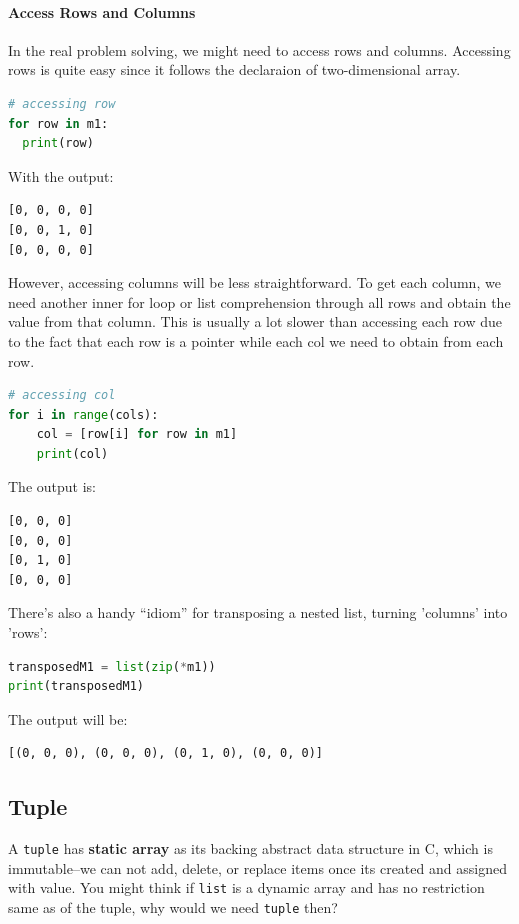 \documentclass[../main.tex]{subfiles}
\begin{document}
\paragraph{Access Rows and Columns} In the real problem solving, we might need to access rows and columns.  Accessing rows is quite easy since it follows the declaraion of two-dimensional array.  
\begin{lstlisting}[language=Python]
# accessing row
for row in m1:
  print(row)
\end{lstlisting}
With the output:
\begin{lstlisting}[numbers=none]
[0, 0, 0, 0]
[0, 0, 1, 0]
[0, 0, 0, 0]
\end{lstlisting}
However, accessing columns will be less straightforward. To get each column, we need another inner for loop or list comprehension through all rows and obtain the value from that column. This is usually a lot slower than accessing each row due to the fact that each row is a pointer while each col we need to obtain from each row. 
\begin{lstlisting}[language=Python]
# accessing col
for i in range(cols):
    col = [row[i] for row in m1]
    print(col)
\end{lstlisting}
The output is:
\begin{lstlisting}[numbers=none]
[0, 0, 0]
[0, 0, 0]
[0, 1, 0]
[0, 0, 0]
\end{lstlisting}
There's also a handy ``idiom'' for transposing a nested list, turning 'columns' into 'rows':
\begin{lstlisting}[language=Python]
transposedM1 = list(zip(*m1))
print(transposedM1)
\end{lstlisting}
The output will be:
\begin{lstlisting}[numbers=none]
[(0, 0, 0), (0, 0, 0), (0, 1, 0), (0, 0, 0)]
\end{lstlisting}


\subsection{Tuple}
A \texttt{tuple} has \textbf{static array} as its backing abstract data structure in C, which is immutable--we can not add, delete, or replace items once its created and assigned with value. You might think if \texttt{list} is a dynamic array and has no restriction same as of the tuple, why would we need \texttt{tuple} then? 
\end{document}
